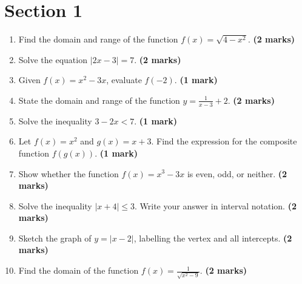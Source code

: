 \documentclass[11pt,a4paper]{article}
\begin{document}
\section*{Section 1}
\begin{enumerate}
    \item Find the domain and range of the function $f(x) = \sqrt{4 - x^2}$. \hfill \textbf{(2 marks)}
    \vspace{0.5cm}

    \item Solve the equation $|2x - 3| = 7$. \hfill \textbf{(2 marks)}
    \vspace{0.5cm}

    \item Given $f(x) = x^2 - 3x$, evaluate $f(-2)$. \hfill \textbf{(1 mark)}
    \vspace{0.5cm}

    \item State the domain and range of the function $y = \frac{1}{x-3} + 2$. \hfill \textbf{(2 marks)}
    \vspace{0.5cm}

    \item Solve the inequality $3 - 2x < 7$. \hfill \textbf{(1 mark)}
    \vspace{0.5cm}

    \item Let $f(x) = x^2$ and $g(x) = x + 3$. Find the expression for the composite function $f(g(x))$. \hfill \textbf{(1 mark)}
    \vspace{0.5cm}

    \item Show whether the function $f(x) = x^3 - 3x$ is even, odd, or neither. \hfill \textbf{(2 marks)}
    \vspace{0.5cm}

    \item Solve the inequality $|x + 4| \le 3$. Write your answer in interval notation. \hfill \textbf{(2 marks)}
    \vspace{0.5cm}

    \item Sketch the graph of $y = |x - 2|$, labelling the vertex and all intercepts. \hfill \textbf{(2 marks)}
    \vspace{0.5cm}

    \item Find the domain of the function $f(x) = \frac{1}{\sqrt{x^2 - 9}}$. \hfill \textbf{(2 marks)}
    \vspace{0.5cm}


\end{enumerate}
\end{document}
